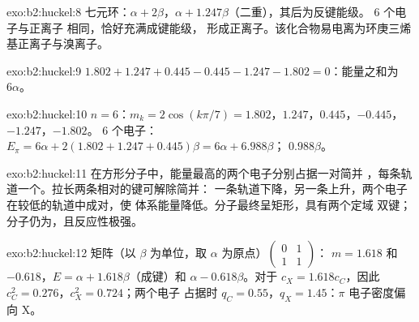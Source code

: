 \begin{solution}{exo:b2:huckel:8}
七元环：$\alpha + 2\beta$，$\alpha + 1.247\beta$（二重），其后为反键能级。
6 个电子与正离子  相同，恰好充满成键能级，
形成正离子。该化合物易电离为环庚三烯基正离子与溴离子。
\end{solution}

\begin{solution}{exo:b2:huckel:9}
$1.802 + 1.247 + 0.445 - 0.445 - 1.247 - 1.802 = 0$：能量之和为 $6\alpha$。
\end{solution}

\begin{solution}{exo:b2:huckel:10}
$n = 6$：$m_k = 2\cos(k\pi/7) = 1.802$，$1.247$，$0.445$，$-0.445$，$-1.247$，$-1.802$。
6 个电子：$E_\pi = 6\alpha + 2(1.802 + 1.247 + 0.445)\beta = 6\alpha + 6.988\beta$；
 $0.988\beta$。
\end{solution}

\begin{solution}{exo:b2:huckel:11}
在方形分子中，能量最高的两个电子分别占据一对简并
，每条轨道一个。拉长两条相对的键可解除简并：
一条轨道下降，另一条上升，两个电子在较低的轨道中成对，使
体系能量降低。分子最终呈矩形，具有两个定域
双键；分子仍为，且反应性极强。
\end{solution}

\begin{solution}{exo:b2:huckel:12}
矩阵（以 $\beta$ 为单位，取 $\alpha$ 为原点）$\begin{pmatrix}0 & 1\\ 1 & 1\end{pmatrix}$：
$m = 1.618$ 和 $-0.618$，$E = \alpha + 1.618\beta$（成键）和 $\alpha - 0.618\beta$。对于
 $c_X = 1.618c_C$，因此 $c_C^2 = 0.276$，$c_X^2 = 0.724$；两个电子
占据时 $q_C = 0.55$，$q_X = 1.45$：$\pi$ 电子密度偏向 X。
\end{solution}

